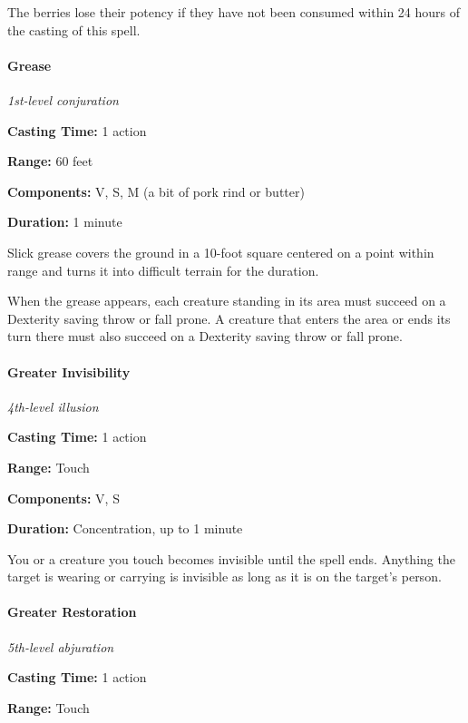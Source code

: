\documentclass[
]{article}
\begin{document}
The berries lose their potency if they have not been consumed within 24
hours of the casting of this spell.

\hypertarget{grease}{%
\paragraph{Grease}\label{grease}}

\emph{1st-level conjuration}

\textbf{Casting Time:} 1 action

\textbf{Range:} 60 feet

\textbf{Components:} V, S, M (a bit of pork rind or butter)

\textbf{Duration:} 1 minute

Slick grease covers the ground in a 10-foot square centered on a point
within range and turns it into difficult terrain for the duration.

When the grease appears, each creature standing in its area must succeed
on a Dexterity saving throw or fall prone. A creature that enters the
area or ends its turn there must also succeed on a Dexterity saving
throw or fall prone.

\hypertarget{greater-invisibility}{%
\paragraph{Greater Invisibility}\label{greater-invisibility}}

\emph{4th-level illusion}

\textbf{Casting Time:} 1 action

\textbf{Range:} Touch

\textbf{Components:} V, S

\textbf{Duration:} Concentration, up to 1 minute

You or a creature you touch becomes invisible until the spell ends.
Anything the target is wearing or carrying is invisible as long as it is
on the target's person.

\hypertarget{greater-restoration}{%
\paragraph{Greater Restoration}\label{greater-restoration}}

\emph{5th-level abjuration}

\textbf{Casting Time:} 1 action

\textbf{Range:} Touch
\end{document}

